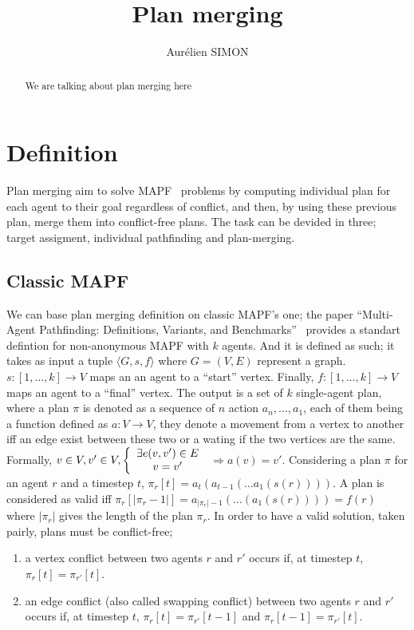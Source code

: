 \documentclass{article}
\begin{document}
\title{Plan merging}

\author{Aurélien SIMON}

\maketitle

\begin{abstract}
We are talking about plan merging here
\end{abstract}


\newpage
\section{Definition}

Plan merging aim to solve MAPF~\cite{ststfekomawaliatcokubabo19a,erkiozsc13a} problems by computing individual plan for each agent to their goal regardless of conflict, and then, by using these previous plan, merge them into conflict-free plans. The task can be devided in three; target assigment, individual pathfinding and plan-merging.

\subsection{Classic MAPF}
We can base plan merging definition on classic MAPF's one; the paper ``Multi-Agent Pathfinding: Definitions, Variants, and Benchmarks''~\cite{ststfekomawaliatcokubabo19a} provides a standart defintion for non-anonymous MAPF with \(k\) agents\@. And it is defined as such; it takes as input a tuple \(\langle G,s,f \rangle \) where \(G=(V,E)\) represent a graph.  \(s : [1,\ldots,k] \rightarrow V\) maps an an agent to a  ``start'' vertex. Finally,  \(f : [1,\ldots,k] \rightarrow V\) maps an agent to a ``final'' vertex. The output is a set of \(k\) single-agent plan, where a plan \(\pi\) is denoted as a sequence of \(n\) action \(a_n,\ldots,a_1\), each of them being a function defined as \(a : V \rightarrow V\), they denote a movement from a vertex to another iff an edge exist between these two or a wating if the two vertices are the same. Formally, \(v \in V, v' \in V, \left\{ \begin{array}{ c l }
    \exists e(v,v') \in E \\
    v=v'              
  \end{array}
\right.\) \(\Rightarrow  a(v) = v'\). Considering a plan \(\pi\) for an agent \(r\) and a timestep \(t\), \(\pi_r[t] =a_t(a_{t-1}(\ldots a_1(s(r))))\). A plan is considered as valid iff \(\pi_r[|\pi_r-1|] = a_{|\pi_r|-1}(\ldots ( a_1(s(r)))) = f(r)\) where \(|\pi_r|\) gives the length of the plan \(\pi_r\). In order to have a valid solution, taken pairly, plans must be conflict-free;
\begin{enumerate}
    \item a vertex conflict between two agents \(r\) and \(r'\) occurs if, at timestep \(t\), \(\pi_r[t]=\pi_{r'}[t]\).
    \item an edge conflict  (also called swapping conflict) between two agents \(r\) and \(r'\) occurs if, at timestep \(t\), \(\pi_r[t]=\pi_{r'}[t-1]\) and \(\pi_r[t-1]=\pi_{r'}[t]\).

\end{enumerate} 
\end{document}
